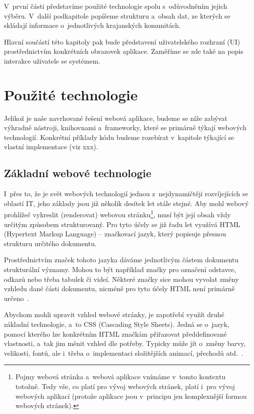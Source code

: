 V~první části představíme použité technologie spolu s~odůvodněním jejich výběru. V~další podkapitole popíšeme strukturu a~obsah dat, ze kterých se skládají informace o~jednotlivých krajanských komunitách.

Hlavní součástí této kapitoly pak bude představení uživatelského rozhraní (UI) prostřednictvím konkrétních obrazovek aplikace. Zaměříme se zde také na popis interakce uživatele se systémem.

\hypertarget{pouux17eituxe9-technologie}{%
\section{Použité technologie}\label{pouux17eituxe9-technologie}}

Jelikož je naše navrhované řešení webová aplikace, budeme se níže zabývat výhradně nástroji, knihovnami a~frameworky, které se primárně týkají webových technologií. Konkrétní příklady kódu budeme rozebírat v~kapitole týkající se vlastní implementace (viz xxx).

\hypertarget{zuxe1kladnuxed-webovuxe9-technologie}{%
\subsection{Základní webové technologie}\label{zuxe1kladnuxed-webovuxe9-technologie}}

I~přes to, že je svět webových technologií jednou z~nejdynamičtěji rozvíjejících se oblastí IT, jeho základy jsou již několik desítek let stále stejné. Aby mohl webový prohlížeč vykreslit (renderovat) webovou stránku\footnote{Pojmy webová stránka a~webová aplikace vnímáme v~tomto kontextu totožně. Tedy vše, co platí pro vývoj webových stránek, platí i~pro vývoj webových aplikací (protože aplikace jsou v~principu jen komplexnější formou webových stránek).}, musí být její obsah vždy určitým způsobem strukturovaný. Pro tyto účely se již řadu let využívá HTML (Hypertext Markup Language) -- značkovací jazyk, který popisuje přesnou strukturu určitého dokumentu.

Prostřednictvím značek tohoto jazyka dáváme jednotlivým částem dokumentu strukturální významy. Mohou to být například značky pro označení odstavce, odkazů nebo třeba tabulek či videí. Některé značky sice mohou vyvolat změny vzhledu dané části dokumentu, nicméně pro tyto účely HTML není primárně určeno~\parencite{htmlcss}.

Abychom mohli upravit vzhled webové stránky, je zapotřebí využít druhé základní technologie, a~to CSS (Cascading Style Sheets). Jedná se o~jazyk, pomocí kterého lze konkrétním HTML značkám přiřazovat předdefinované vlastnosti, a~tak jim měnit vzhled dle potřeby. Typicky může jít o~změny barvy, velikosti, fontů, ale i~třeba o~implementaci složitějších animací, přechodů atd.~\parencite{htmlcss}.

